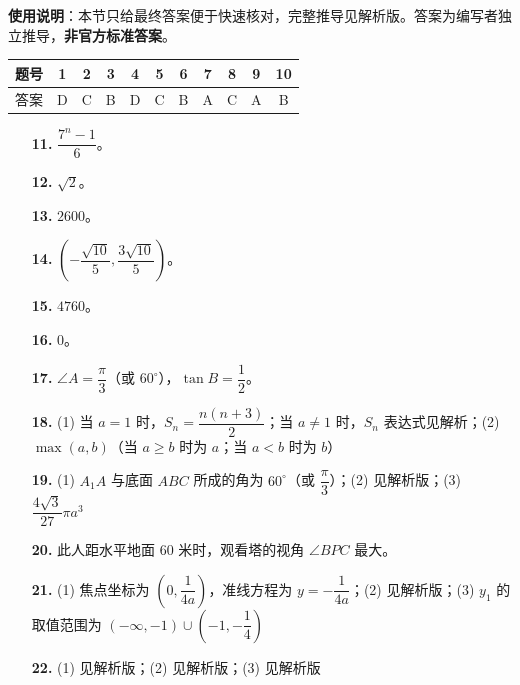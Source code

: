 
\begin{gknotice}
\textbf{使用说明}：本节只给最终答案便于快速核对，完整推导见解析版。答案为编写者独立推导，\textbf{非官方标准答案}。
\end{gknotice}

\begin{center}\begin{tabular}{ccccccccccc}
\toprule
题号 & 1 & 2 & 3 & 4 & 5 & 6 & 7 & 8 & 9 & 10 \\
\midrule
答案 & D & C & B & D & C & B & A & C & A & B \\
\bottomrule
\end{tabular}\end{center}

\begin{itemize}[leftmargin=2.6em]
  \item[\textbf{11.}] $\dfrac{7^n - 1}{6}$。
  \item[\textbf{12.}] $\sqrt{2}$。
  \item[\textbf{13.}] $2600$。
  \item[\textbf{14.}] $\left(-\dfrac{\sqrt{10}}{5}, \dfrac{3\sqrt{10}}{5}\right)$。
  \item[\textbf{15.}] $4760$。
  \item[\textbf{16.}] $0$。
\end{itemize}

\begin{itemize}[leftmargin=2.6em]
  \item[\textbf{17.}] $\angle A = \dfrac{\pi}{3}$（或 $60^\circ$），$\tan B = \dfrac{1}{2}$。
  \item[\textbf{18.}] (1) 当 $a = 1$ 时，$S_n = \dfrac{n(n+3)}{2}$；当 $a \neq 1$ 时，$S_n$ 表达式见解析；(2) $\max(a, b)$（当 $a \geqslant b$ 时为 $a$；当 $a < b$ 时为 $b$）
  \item[\textbf{19.}] (1) $A_1A$ 与底面 $ABC$ 所成的角为 $60^\circ$（或 $\dfrac{\pi}{3}$）；(2) 见解析版；(3) $\dfrac{4\sqrt{3}}{27}\pi a^3$
  \item[\textbf{20.}] 此人距水平地面 $60$ 米时，观看塔的视角 $\angle BPC$ 最大。
  \item[\textbf{21.}] (1) 焦点坐标为 $\left(0, \dfrac{1}{4a}\right)$，准线方程为 $y = -\dfrac{1}{4a}$；(2) 见解析版；(3) $y_1$ 的取值范围为 $(-\infty, -1) \cup \left(-1, -\dfrac{1}{4}\right)$
  \item[\textbf{22.}] (1) 见解析版；(2) 见解析版；(3) 见解析版
\end{itemize}
